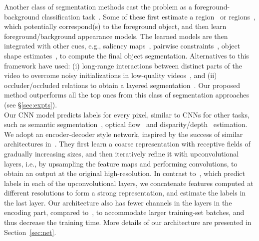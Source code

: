 \documentclass[10pt,twocolumn,letterpaper]{article}
\begin{document}
Another class of segmentation methods cast the problem as a
foreground-background classification
task~\cite{Faktor14,papazoglou2013fast,wang2015saliency,taylor2015causal,zhang2013video,lee2011key}.
Some of these first estimate a
region~\cite{papazoglou2013fast,wang2015saliency} or
regions~\cite{lee2011key,zhang2013video}, which potentially correspond(s) to
the foreground object, and then learn foreground/background appearance models.
The learned models are then integrated with other cues, e.g., saliency
maps~\cite{wang2015saliency}, pairwise
constraints~\cite{papazoglou2013fast,zhang2013video}, object shape
estimates~\cite{lee2011key}, to compute the final object segmentation.
Alternatives to this framework have used: (i) long-range interactions between
distinct parts of the video to overcome noisy initializations in low-quality
videos~\cite{Faktor14}, and (ii) occluder/occluded relations to obtain a
layered segmentation~\cite{taylor2015causal}. Our proposed method outperforms
all the top ones from this class of segmentation approaches (see
\S\ref{sec:expts}).\\

\vspace{-0.4cm}
 Our CNN model predicts labels for every
pixel, similar to CNNs for other tasks, such as semantic
segmentation~\cite{long2015fully,Hariharan15,Ronneberger15}, optical
flow~\cite{Dosovitskiy15} and disparity/depth~\cite{Mayer16}
estimation. We adopt an encoder-decoder style network, inspired by the success
of similar architectures in~\cite{Dosovitskiy15,long2015fully,Ronneberger15}.
They first learn a coarse representation with receptive fields of gradually
increasing sizes, and then iteratively refine it with upconvolutional layers,
i.e., by upsampling the feature maps and performing convolutions, to obtain an
output at the original high-resolution. In contrast
to~\cite{Dosovitskiy15,long2015fully}, which predict labels in each of the
upconvolutional layers, we concatenate features computed at different
resolutions to form a strong representation, and estimate the labels in the
last layer. Our architecture also has fewer channels in the layers in the
encoding part, compared to~\cite{Ronneberger15}, to accommodate larger
training-set batches, and thus decrease the training time. More details of our
architecture are presented in Section~\ref{sec:net}.
\end{document}
